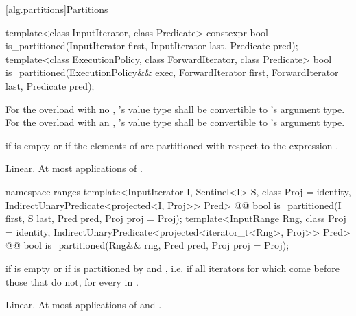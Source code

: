 [alg.partitions]{Partitions}

%
\begin{itemdecl}
template<class InputIterator, class Predicate>
  constexpr bool is_partitioned(InputIterator first, InputIterator last, Predicate pred);
template<class ExecutionPolicy, class ForwardIterator, class Predicate>
  bool is_partitioned(ExecutionPolicy&& exec,
                      ForwardIterator first, ForwardIterator last, Predicate pred);
\end{itemdecl}

\begin{itemdescr}
\pnum
\requires For the overload with no ,
's value type shall be convertible to 's
argument type.  For the overload with an ,
's value type shall be convertible to 's
argument type.

\pnum
\returns {} if
 is empty or if
the elements  of
 are partitioned with respect to the expression
.

\pnum
\complexity Linear. At most  applications of .
\end{itemdescr}

\begin{addedblock}
%
\begin{itemdecl}
namespace ranges {
  template<InputIterator I, Sentinel<I> S, class Proj = identity,
      IndirectUnaryPredicate<projected<I, Proj>> Pred>
    @@ bool is_partitioned(I first, S last, Pred pred, Proj proj = Proj{});
  template<InputRange Rng, class Proj = identity,
      IndirectUnaryPredicate<projected<iterator_t<Rng>, Proj>> Pred>
    @@ bool is_partitioned(Rng&& rng, Pred pred, Proj proj = Proj{});
}
\end{itemdecl}

\begin{itemdescr}
\pnum
\returns {} if
 is empty or if
 is partitioned by  and , i.e. if all
iterators  for which
 come before those that do not,
for every  in .

\pnum
\complexity Linear. At most  applications of  and .
\end{itemdescr}
\end{addedblock}

